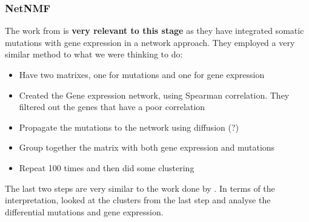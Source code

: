 \subsubsection{NetNMF} 
The work from \citet{He2017-dj} is \textbf{very relevant to this stage} as they have integrated somatic mutations with gene expression in a network approach.  They employed a very similar method to what we were thinking to do:
\begin{itemize}
    \item Have two matrixes, one for mutations and one for gene expression
    \item Created the Gene expression network, using Spearman correlation. They filtered out the genes that have a poor correlation
    \item Propagate the mutations to the network using diffusion (?)
    \item Group together the matrix with both gene expression and mutations
    \item Repeat 100 times and then did some clustering

\end{itemize}

The last two steps are very similar to the work done by \citet{Robertson2017-mg}. In terms of the interpretation, \citet{He2017-dj} looked at the clusters from the last step and analyse the differential mutations and gene expression.
\\~\\

